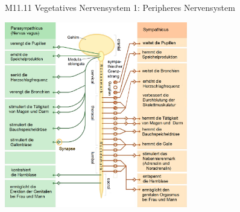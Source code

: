 \documentclass{beamer}
\begin{document}







\begin{frame}{M11.11 Vegetatives Nervensystem 1: Peripheres Nervensystem}

\begin{center}
    \includegraphics[width=0.6\textwidth]{Das_vegetative_Nervensystem.png}
\end{center}

    
\end{frame}




\end{document}
